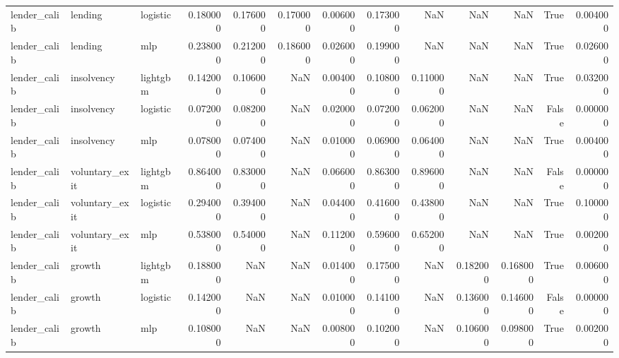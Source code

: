 \begin{table}
\begin{tabular}{lllrrrrrrrrrr}
lender_calib & lending & logistic & 0.180000 & 0.176000 & 0.170000 & 0.006000 & 0.173000 & NaN & NaN & NaN & True & 0.004000 \\
lender_calib & lending & mlp & 0.238000 & 0.212000 & 0.186000 & 0.026000 & 0.199000 & NaN & NaN & NaN & True & 0.026000 \\
lender_calib & insolvency & lightgbm & 0.142000 & 0.106000 & NaN & 0.004000 & 0.108000 & 0.110000 & NaN & NaN & True & 0.032000 \\
lender_calib & insolvency & logistic & 0.072000 & 0.082000 & NaN & 0.020000 & 0.072000 & 0.062000 & NaN & NaN & False & 0.000000 \\
lender_calib & insolvency & mlp & 0.078000 & 0.074000 & NaN & 0.010000 & 0.069000 & 0.064000 & NaN & NaN & True & 0.004000 \\
lender_calib & voluntary_exit & lightgbm & 0.864000 & 0.830000 & NaN & 0.066000 & 0.863000 & 0.896000 & NaN & NaN & False & 0.000000 \\
lender_calib & voluntary_exit & logistic & 0.294000 & 0.394000 & NaN & 0.044000 & 0.416000 & 0.438000 & NaN & NaN & True & 0.100000 \\
lender_calib & voluntary_exit & mlp & 0.538000 & 0.540000 & NaN & 0.112000 & 0.596000 & 0.652000 & NaN & NaN & True & 0.002000 \\
lender_calib & growth & lightgbm & 0.188000 & NaN & NaN & 0.014000 & 0.175000 & NaN & 0.182000 & 0.168000 & True & 0.006000 \\
lender_calib & growth & logistic & 0.142000 & NaN & NaN & 0.010000 & 0.141000 & NaN & 0.136000 & 0.146000 & False & 0.000000 \\
lender_calib & growth & mlp & 0.108000 & NaN & NaN & 0.008000 & 0.102000 & NaN & 0.106000 & 0.098000 & True & 0.002000 \\
\bottomrule
\end{tabular}
\end{table}
